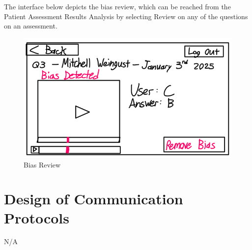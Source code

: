 \documentclass[12pt, titlepage]{article}
\begin{document}
\hspace{1.5em}The interface below depicts the bias review, which can be reached from the Patient Assessment Results Analysis by selecting Review on any of the questions on an assessment.
\begin{figure}[H]
  \centering
  \includegraphics[scale=0.9]{images/Review-Bias.png}
  \caption{Bias Review}
\end{figure}

\section{Design of Communication Protocols}

N/A
\end{document}
